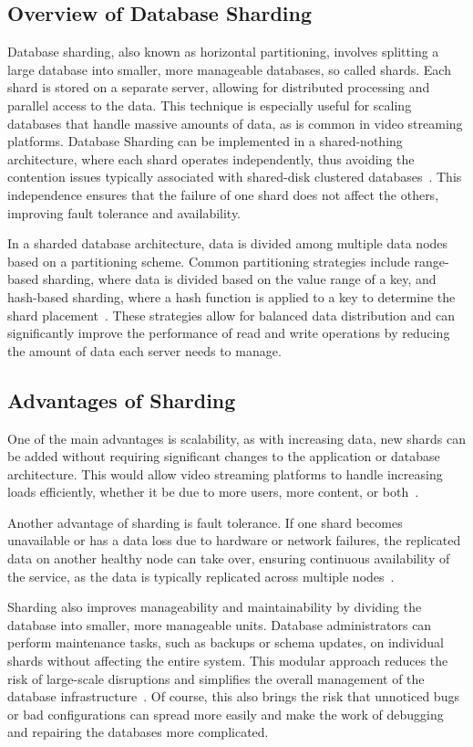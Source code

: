 \subsection{Overview of Database Sharding}
Database sharding, also known as horizontal partitioning, involves splitting a large database into smaller, more manageable databases, so called shards. Each shard is stored on a separate server, allowing for distributed processing and parallel access to the data. This technique is especially useful for scaling databases that handle massive amounts of data, as is common in video streaming platforms. Database Sharding can be implemented in a shared-nothing architecture, where each shard operates independently, thus avoiding the contention issues typically associated with shared-disk clustered databases~\parencite{db_sharding}. This independence ensures that the failure of one shard does not affect the others, improving fault tolerance and availability.

In a sharded database architecture, data is divided among multiple data nodes based on a partitioning scheme. Common partitioning strategies include range-based sharding, where data is divided based on the value range of a key, and hash-based sharding, where a hash function is applied to a key to determine the shard placement~\parencite{db_sharding}. These strategies allow for balanced data distribution and can significantly improve the performance of read and write operations by reducing the amount of data each server needs to manage.

\subsection{Advantages of Sharding}
One of the main advantages is scalability, as with increasing data, new shards can be added without requiring significant changes to the application or database architecture. This would allow video streaming platforms to handle increasing loads efficiently, whether it be due to more users, more content, or both~\parencite{db_sharding}.

Another advantage of sharding is fault tolerance. If one shard becomes unavailable or has a data loss due to hardware or network failures, the replicated data on another healthy node can take over, ensuring continuous availability of the service, as the data is typically replicated across multiple nodes~\parencite{db_sharding}.

Sharding also improves manageability and maintainability by dividing the database into smaller, more manageable units. Database administrators can perform maintenance tasks, such as backups or schema updates, on individual shards without affecting the entire system. This modular approach reduces the risk of large-scale disruptions and simplifies the overall management of the database infrastructure~\parencite{db_sharding}. Of course, this also brings the risk that unnoticed bugs or bad configurations can spread more easily and make the work of debugging and repairing the databases more complicated. 

